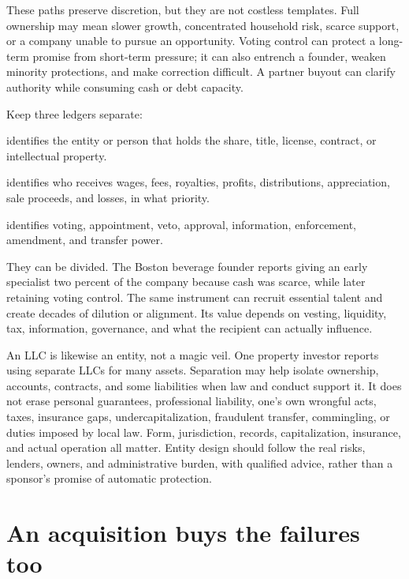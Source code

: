 These paths preserve discretion, but they are not costless templates. Full
ownership may mean slower growth, concentrated household risk, scarce support,
or a company unable to pursue an opportunity. Voting control can protect a
long-term promise from short-term pressure; it can also entrench a founder,
weaken minority protections, and make correction difficult. A partner buyout
can clarify authority while consuming cash or debt capacity.

Keep three ledgers separate:

\begin{description}[leftmargin=2.6em,style=nextline]
\item[Legal ownership] identifies the entity or person that holds the share,
  title, license, contract, or intellectual property.
\item[Economic participation] identifies who receives wages, fees, royalties,
  profits, distributions, appreciation, sale proceeds, and losses, in what
  priority.
\item[Control] identifies voting, appointment, veto, approval, information,
  enforcement, amendment, and transfer power.
\end{description}

They can be divided. The Boston beverage founder reports giving an early
specialist two percent of the company because cash was scarce, while later
retaining voting control. The same instrument can recruit essential talent and
create decades of dilution or alignment. Its value depends on vesting,
liquidity, tax, information, governance, and what the recipient can actually
influence.

An LLC is likewise an entity, not a magic veil. One property investor reports
using separate LLCs for many assets. Separation may help isolate ownership,
accounts, contracts, and some liabilities when law and conduct support it. It
does not erase personal guarantees, professional liability, one's own wrongful
acts, taxes, insurance gaps, undercapitalization, fraudulent transfer,
commingling, or duties imposed by local law. Form, jurisdiction, records,
capitalization, insurance, and actual operation all matter. Entity design
should follow the real risks, lenders, owners, and administrative burden, with
qualified advice, rather than a sponsor's promise of automatic protection.

\section{An acquisition buys the failures too}

